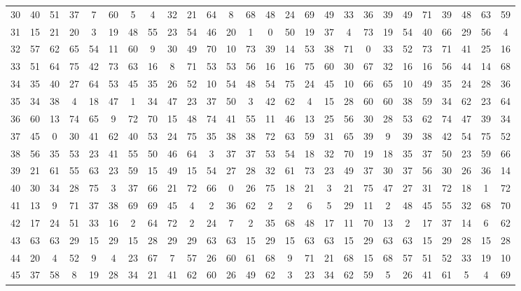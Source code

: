 \begin{table}
\begin{tabular}{c c c c c c c c c c c c c c c c c c c c c c c c c c }
30 & 40 & 51 & 37 & 7 & 60 & 5 & 4 & 32 & 21 & 64 & 8 & 68 & 48 & 24 & 69 & 49 & 33 & 36 & 39 & 49 & 71 & 39 & 48 & 63 & 59 \\
31 & 15 & 21 & 20 & 3 & 19 & 48 & 55 & 23 & 54 & 46 & 20 & 1 & 0 & 50 & 19 & 37 & 4 & 73 & 19 & 54 & 40 & 66 & 29 & 56 & 4 \\
32 & 57 & 62 & 65 & 54 & 11 & 60 & 9 & 30 & 49 & 70 & 10 & 73 & 39 & 14 & 53 & 38 & 71 & 0 & 33 & 52 & 73 & 71 & 41 & 25 & 16 \\
33 & 51 & 64 & 75 & 42 & 73 & 63 & 16 & 8 & 71 & 53 & 53 & 56 & 16 & 16 & 75 & 60 & 30 & 67 & 32 & 16 & 16 & 56 & 44 & 14 & 68 \\
34 & 35 & 40 & 27 & 64 & 53 & 45 & 35 & 26 & 52 & 10 & 54 & 48 & 54 & 75 & 24 & 45 & 10 & 66 & 65 & 10 & 49 & 35 & 24 & 28 & 36 \\
35 & 34 & 38 & 4 & 18 & 47 & 1 & 34 & 47 & 23 & 37 & 50 & 3 & 42 & 62 & 4 & 15 & 28 & 60 & 60 & 38 & 59 & 34 & 62 & 23 & 64 \\
36 & 60 & 13 & 74 & 65 & 9 & 72 & 70 & 15 & 48 & 74 & 41 & 55 & 11 & 46 & 13 & 25 & 56 & 30 & 28 & 53 & 62 & 74 & 47 & 39 & 34 \\
37 & 45 & 0 & 30 & 41 & 62 & 40 & 53 & 24 & 75 & 35 & 38 & 38 & 72 & 63 & 59 & 31 & 65 & 39 & 9 & 39 & 38 & 42 & 54 & 75 & 52 \\
38 & 56 & 35 & 53 & 23 & 41 & 55 & 50 & 46 & 64 & 3 & 37 & 37 & 53 & 54 & 18 & 32 & 70 & 19 & 18 & 35 & 37 & 50 & 23 & 59 & 66 \\
39 & 21 & 61 & 55 & 63 & 23 & 59 & 15 & 49 & 15 & 54 & 27 & 28 & 32 & 61 & 73 & 23 & 49 & 37 & 30 & 37 & 56 & 30 & 26 & 36 & 14 \\
40 & 30 & 34 & 28 & 75 & 3 & 37 & 66 & 21 & 72 & 66 & 0 & 26 & 75 & 18 & 21 & 3 & 21 & 75 & 47 & 27 & 31 & 72 & 18 & 1 & 72 \\
41 & 13 & 9 & 71 & 37 & 38 & 69 & 69 & 45 & 4 & 2 & 36 & 62 & 2 & 2 & 6 & 5 & 29 & 11 & 2 & 48 & 45 & 55 & 32 & 68 & 70 \\
42 & 17 & 24 & 51 & 33 & 16 & 2 & 64 & 72 & 2 & 24 & 7 & 2 & 35 & 68 & 48 & 17 & 11 & 70 & 13 & 2 & 17 & 37 & 14 & 6 & 62 \\
43 & 63 & 63 & 29 & 15 & 29 & 15 & 28 & 29 & 29 & 63 & 63 & 15 & 29 & 15 & 63 & 63 & 15 & 29 & 63 & 63 & 15 & 29 & 28 & 15 & 28 \\
44 & 20 & 4 & 52 & 9 & 4 & 23 & 67 & 7 & 57 & 26 & 60 & 61 & 68 & 9 & 71 & 21 & 68 & 15 & 68 & 57 & 51 & 52 & 33 & 19 & 10 \\
45 & 37 & 58 & 8 & 19 & 28 & 34 & 21 & 41 & 62 & 60 & 26 & 49 & 62 & 3 & 23 & 34 & 62 & 59 & 5 & 26 & 41 & 61 & 5 & 4 & 69 \\

\end{tabular}
\end{table}

